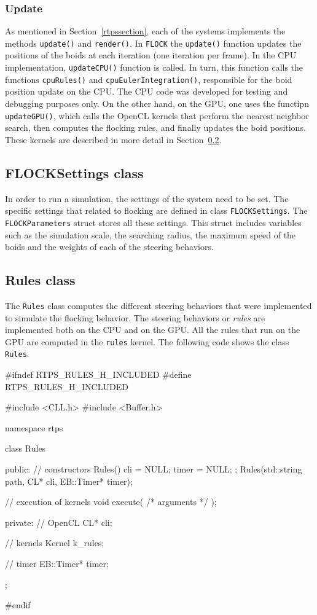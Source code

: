 \subsubsection{Update}
As mentioned in Section~\ref{rtpssection}, each of the systems implements the methods \texttt{update()} and \texttt{render()}. In \texttt{FLOCK} the \texttt{update()} function updates the positions of the boids at each iteration (one iteration per frame). In the CPU implementation, \texttt{updateCPU()} function is called. In turn, this function calls the functions \texttt{cpuRules()} and \texttt{cpuEulerIntegration()}, responsible for the boid position update on the CPU. The CPU code was developed for testing and debugging purposes only. On the other hand, on the GPU, one uses the functipn \texttt{updateGPU()}, which calls the OpenCL kernels that perform the nearest neighbor search, then computes the flocking rules, and finally updates the boid positions. These kernels are described in more detail in Section~\ref{rulesclass}.

\subsection{FLOCKSettings class}
In order to run a simulation, the settings of the system need to be set. The specific settings that related to flocking are defined in class \texttt{FLOCKSettings}. The \texttt{FLOCKParameters} struct stores all these settings. This struct includes variables such as the simulation scale, the searching radius, the maximum speed of the boids and the weights of each of the 
steering behaviors. 

\subsection{Rules class}\label{rulesclass}
The \texttt{Rules} class computes the different steering behaviors that were implemented to simulate the flocking behavior. The steering behaviors or \textit{rules} are implemented both on the CPU and on the GPU. All the rules that run on the GPU are computed in the \texttt{rules} kernel. The following code shows the class \texttt{Rules}.

\begin{cppcode}{0}
#ifndef RTPS_RULES_H_INCLUDED
#define RTPS_RULES_H_INCLUDED

#include <CLL.h>
 #include <Buffer.h>

namespace rtps
 {
	class Rules
	{
		public:
			// constructors
			Rules() { cli = NULL; timer = NULL; };
			Rules(std::string path, CL* cli, EB::Timer* timer);
			
			// execution of kernels
			void execute( /* arguments */ );
			
		private:
			// OpenCL
			CL* cli;
			
			// kernels
			Kernel k_rules;
			
			// timer
			EB::Timer* timer;
	};
}
#endif
\end{cppcode}

